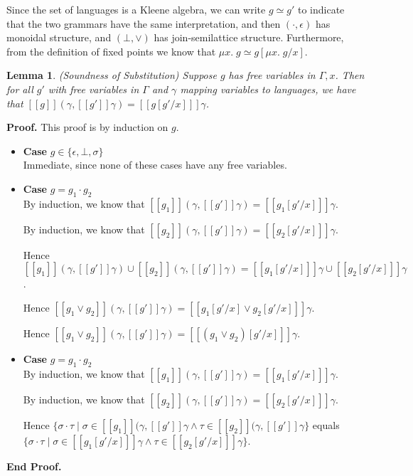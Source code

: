 \documentclass{article}
\newcommand{\fix}[2]{\mu {#1}.\;{#2}}
\newcommand{\interp}[1]{[\![{#1}]\!]}
\newcommand{\setof}[1]{\{{#1}\}}
\newcommand{\comprehend}[2]{\setof{{#1}\;|\;{#2}}}
\newtheorem{lemma}{Lemma}
\newenvironment{proof}{\noindent\textbf{Proof.}}{\noindent\textbf{End Proof.}}
\newenvironment{caseblock}{\begin{itemize}}{\end{itemize}}
\newenvironment{case}[1]{\item \textbf{Case} {#1}\\}{}
\begin{document}
Since the set of languages is a Kleene algebra, we can write $g \simeq
g'$ to indicate that the two grammars have the same interpretation,
and then $(\cdot, \epsilon)$ has monoidal structure, and $(\bot,
\vee)$ has join-semilattice structure. Furthermore, from the definition
of fixed points we know that $\fix{x}{g} \simeq g[\fix{x}{g}/x]$. 

\begin{lemma}{(Soundness of Substitution)}
Suppose $g$ has free variables in $\Gamma, x$. 
Then for all  $g'$ with free variables in $\Gamma$ and $\gamma$ mapping variables
to languages, we have that $\interp{g}(\gamma, \interp{g'}\gamma) = \interp{g[g'/x]}\gamma$. 
\end{lemma}

\begin{proof}
  This proof is by induction on $g$. 

  \begin{caseblock}
    \begin{case}{$g \in \setof{\epsilon, \bot, \sigma}$}
      Immediate, since none of these cases have any free variables. 
    \end{case}

    \begin{case}{$g = g_1 \cdot g_2$}
      By induction, we know that $\interp{g_1}(\gamma, \interp{g'}\gamma) = \interp{g_1[g'/x]}\gamma$.

      By induction, we know that $\interp{g_2}(\gamma, \interp{g'}\gamma) = \interp{g_2[g'/x]}\gamma$.

      Hence $\interp{g_1}(\gamma, \interp{g'}\gamma) \cup \interp{g_2}(\gamma, \interp{g'}\gamma) = \interp{g_1[g'/x]}\gamma \cup \interp{g_2[g'/x]}\gamma$.

      Hence $\interp{g_1 \vee g_2}(\gamma, \interp{g'}\gamma) = \interp{g_1[g'/x] \vee g_2[g'/x]}\gamma$.

      Hence $\interp{g_1 \vee g_2}(\gamma, \interp{g'}\gamma) = \interp{(g_1 \vee g_2)[g'/x]}\gamma$.
    \end{case}

    \begin{case}{$g = g_1\cdot g_2$}
      By induction, we know that $\interp{g_1}(\gamma, \interp{g'}\gamma) = \interp{g_1[g'/x]}\gamma$.

      By induction, we know that $\interp{g_2}(\gamma, \interp{g'}\gamma) = \interp{g_2[g'/x]}\gamma$.

      Hence $\comprehend{\sigma\cdot\tau}{\sigma\in\interp{g_1}(\gamma, \interp{g'}\gamma \land \tau\in\interp{g_2}(\gamma, \interp{g'}\gamma}$ equals \\
      \noindent $\comprehend{\sigma\cdot\tau}{\sigma\in\interp{g_1[g'/x]}\gamma \land \tau\in\interp{g_2[g'/x]}\gamma}$.


\end{case}
\end{caseblock}
\end{proof}
\end{document}
